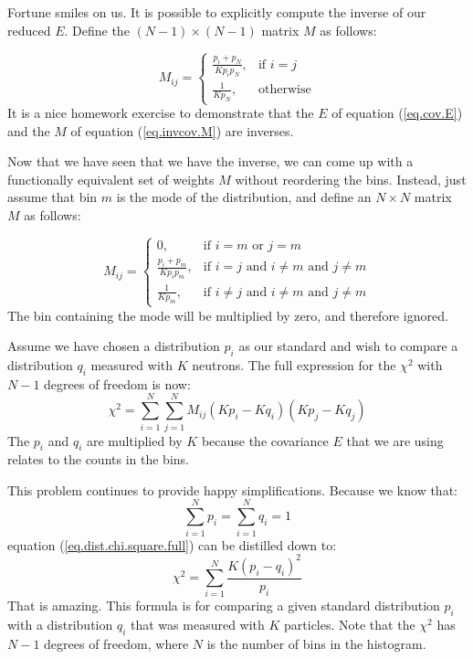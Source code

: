 \documentclass[letterpaper,12pt]{article}
\newcommand{\myMatrix}[1]{\bm{\mathit{#1}}}
\begin{document}
Fortune smiles on us. It is possible to explicitly compute the inverse of our reduced $\myMatrix{E}$. Define the $(N-1) \times (N-1)$ matrix $\myMatrix{M}$ as follows:

\begin{equation} \label{eq.invcov.M}
	\myMatrix{M}_{ij}=
	\begin{cases}
		\frac{p_i+p_N}{Kp_ip_N}, & \text{if } i=j \\
		\frac{1}{Kp_N},  & \text{otherwise}
	\end{cases}
\end{equation}
It is a nice homework exercise to demonstrate that the $\myMatrix{E}$ of equation (\ref{eq.cov.E}) and the $\myMatrix{M}$ of equation (\ref{eq.invcov.M}) are inverses.

Now that we have seen that we have the inverse, we can come up with a functionally equivalent set of weights $\myMatrix{M}$ without reordering the bins. Instead, just assume that bin $m$ is the mode of the distribution, and define an $N \times N$ matrix $\myMatrix{M}$ as follows:

\begin{equation} \label{eq.invcov.M}
	\myMatrix{M}_{ij}=
	\begin{cases}
		0, & \text{if }i=m\text{ or }j=m \\
		\frac{p_i+p_m}{Kp_ip_m}, & \text{if }i=j\text{ and }i\ne m\text{ and }j\ne m \\
		\frac{1}{Kp_m},  & \text{if }i\ne j\text{ and }i\ne m\text{ and }j\ne m
	\end{cases}
\end{equation}
The bin containing the mode will be multiplied by zero, and therefore ignored.

Assume we have chosen a distribution $p_i$ as our standard and wish to compare a distribution $q_i$ measured with $K$ neutrons. The full expression for the $\chi^2$ with $N-1$ degrees of freedom is now:
\begin{equation} \label{eq.dist.chi.square.full}
\chi^2=\sum_{i=1}^N \sum_{j=1}^N \myMatrix{M}_{ij}(Kp_i - Kq_i)(Kp_j - Kq_j)
\end{equation}
The $p_i$ and $q_i$ are multiplied by $K$ because the covariance $\myMatrix{E}$ that we are using relates to the counts in the bins.

This problem continues to provide happy simplifications. Because we know that:
\begin{equation}
\sum_{i=1}^{N}p_i=\sum_{i=1}^{N}q_i=1
\end{equation}
equation (\ref{eq.dist.chi.square.full}) can be distilled down to:
\begin{equation}
\chi^2=\sum_{i=1}^N\frac{K(p_i - q_i)^2}{p_i}
\end{equation}
That is amazing. This formula is for comparing a given standard distribution $p_i$ with a distribution $q_i$ that was measured with $K$ particles. Note that the $\chi^2$ has $N-1$ degrees of freedom, where $N$ is the number of bins in the histogram.
\end{document}
